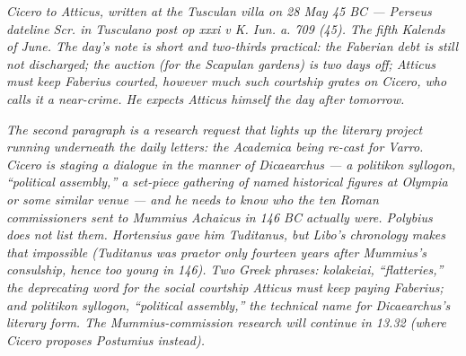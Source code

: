
\textit{Cicero to Atticus, written at the Tusculan villa on 28 May
45 BC --- Perseus dateline \textit{Scr. in Tusculano post op xxxi v
K. Iun. a. 709 (45)}. The fifth Kalends of June. The day's note is
short and two-thirds practical: the Faberian debt is still not
discharged; the auction (for the Scapulan gardens) is two days
off; Atticus must keep Faberius courted, however much such
courtship grates on Cicero, who calls it a near-crime. He expects
Atticus himself the day after tomorrow.}

\textit{The second paragraph is a research request that lights up
the literary project running underneath the daily letters: the
Academica being re-cast for Varro. Cicero is staging a dialogue in
the manner of Dicaearchus --- a \textit{politikon syllogon},
``political assembly,'' a set-piece gathering of named historical
figures at Olympia or some similar venue --- and he needs to know
who the ten Roman commissioners sent to Mummius Achaicus in 146 BC
actually were. Polybius does not list them. Hortensius gave him
Tuditanus, but Libo's chronology makes that impossible (Tuditanus
was praetor only fourteen years after Mummius's consulship, hence
too young in 146). Two Greek phrases: \textit{kolakeiai},
``flatteries,'' the deprecating word for the social courtship
Atticus must keep paying Faberius; and \textit{politikon syllogon},
``political assembly,'' the technical name for Dicaearchus's
literary form. The Mummius-commission research will continue in
13.32 (where Cicero proposes Postumius instead).}
